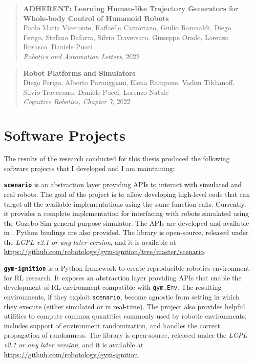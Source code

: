 \begin{quote}
    \textbf{ADHERENT: Learning Human-like Trajectory Generators for Whole-body Control of Humanoid Robots} \\
    Paolo Maria Viceconte, Raffaello Camoriano, Giulio Romualdi, Diego Ferigo, Stefano Dafarra, Silvio Traversaro, Giuseppe Oriolo, Lorenzo Rosasco, Daniele Pucci \\
    \textit{Robotics and Automation Letters}, 2022
\end{quote}

\begin{quote}
    \textbf{Robot Platforms and Simulators} \\
    Diego Ferigo, Alberto Parmiggiani, Elena Rampone, Vadim Tikhanoff, Silvio Traversaro, Daniele Pucci, Lorenzo Natale \\
    \textit{Cognitive Robotics, Chapter 7}, 2022
\end{quote}

\section*{Software Projects}

The results of the research conducted for this thesis produced the following software projects that I developed and I am maintaining:

\vspace{3mm}
\noindent
\textbf{\texttt{scenario}} is an abstraction layer providing \acp{API} to interact with simulated and real robots. The goal of the project is to allow developing high-level code that can target all the available implementations using the same function calls. Currently, it provides a complete implementation for interfacing with robots simulated using the Gazebo Sim general-purpose simulator. The \acp{API} are developed and available in \cpp. Python bindings are also provided. The library is open-source, released under the \emph{LGPL v2.1 or any later version}, and it is available at \linebreak \url{https://github.com/robotology/gym-ignition/tree/master/scenario}.

\vspace{3mm}
\noindent
\textbf{\texttt{gym-ignition}} is a Python framework to create reproducible robotics environment for \ac{RL} research. It exposes an abstraction layer providing \acp{API} that enable the development of \ac{RL} environment compatible with \texttt{gym.Env}. The resulting environments, if they exploit \texttt{scenario},  become agnostic from setting in which they execute (either simulated or in real-time). The project also provides helpful utilities to compute common quantities commonly used by robotic environments, includes support of environment randomization, and handles the correct propagation of randomness. The library is open-source, released under the \emph{LGPL v2.1 or any later version}, and it is available at \linebreak \url{https://github.com/robotology/gym-ignition}.

